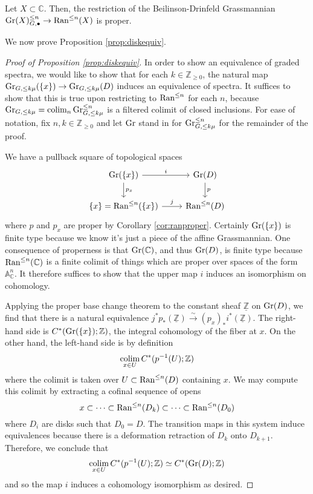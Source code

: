 \begin{cor}\label{cor:ranproper}
Let $X\subset \mathbb{C}$.  Then, the restriction of the Beilinson-Drinfeld Grassmannian $\operatorname{\mathrm{Gr}}(X)_{G,\bullet}^{\leq n} \to \mathrm{Ran}^{\leq n}(X)$ is proper.
\end{cor}

We now prove Proposition \ref{prop:diskequiv}.  

\begin{proof}[Proof of Proposition \ref{prop:diskequiv}]
In order to show an equivalence of graded spectra, we would like to show that for each $k\in \mathbb{Z}_{\geq 0}$, the natural map $\operatorname{\mathrm{Gr}}_{G,\leq k \mu}(\{ x\}) \to \operatorname{\mathrm{Gr}}_{G,\leq k\mu}(D)$ induces an equivalence of spectra.  It suffices to show that this is true upon restricting to $\operatorname{\mathrm{Ran}}^{\leq n}$ for each $n$, because $\operatorname{\mathrm{Gr}}_{G, \leq k \mu} = \operatorname*{\mathrm{colim}}_n \operatorname{\mathrm{Gr}}^{\leq n}_{G,\leq k\mu}$ is a filtered colimit of closed inclusions.  For ease of notation, fix $n,k\in \mathbb{Z}_{\geq 0}$ and let $\operatorname{\mathrm{Gr}}$ stand in for $\operatorname{\mathrm{Gr}}^{\leq n}_{G,\leq k \mu}$ for the remainder of the proof.  

We have a pullback square of topological spaces 
\begin{equation*}
\begin{tikzcd}
\Gra (\{ x\}) \arrow[r,"i"]\arrow[d,"p_x"] & \Gra (D) \arrow[d,"p"]\\
\{x \} = \Ran^{\leq n}(\{ x\} )\arrow[r,"j"] & \Ran^{\leq n}(D)
\end{tikzcd} \end{equation*}
where $p$ and $p_x$ are proper by Corollary \ref{cor:ranproper}.  Certainly $\operatorname{\mathrm{Gr}}(\{ x\})$ is finite type because we know it's just a piece of the affine Grassmannian.  One consequence of properness is that $\operatorname{\mathrm{Gr}}(\mathbb{C})$, and thus $\operatorname{\mathrm{Gr}}(D)$, is finite type because $\operatorname{\mathrm{Ran}}^{\leq n}(\mathbb{C})$ is a finite colimit of things which are proper over spaces of the form $\mathbb{A}^n_{\mathbb{C}}$.  It therefore suffices to show that the upper map $i$ induces an isomorphism on cohomology.  

Applying the proper base change theorem to the constant sheaf $\underline{\mathbb{Z}}$ on $\operatorname{\mathrm{Gr}}(D)$, we find that there is a natural equivalence $j^*p_*(\underline{\mathbb{Z}}) \xrightarrow{\sim} (p_x)_{*}i^*(\underline{\mathbb{Z}}).$  The right-hand side is $C^*(\operatorname{\mathrm{Gr}}(\{x\}) ;\mathbb{Z})$, the integral cohomology of the fiber at $x$.  On the other hand, the left-hand side is by definition $$\operatorname*{\mathrm{colim}}_{x\in U} C^*(p^{-1}(U);\mathbb{Z})$$ where the colimit is taken over $U\subset \operatorname{\mathrm{Ran}}^{\leq n}(D)$ containing $x$.  We may compute this colimit by extracting a cofinal sequence of opens $$x \subset \cdots \subset \operatorname{\mathrm{Ran}}^{\leq n}(D_k) \subset \cdots \subset \operatorname{\mathrm{Ran}}^{\leq n}(D_0)$$ where $D_i$ are disks such that $D_0=D$.  The transition maps in this system induce equivalences because there is a deformation retraction of $D_k$ onto $D_{k+1}$.  Therefore, we conclude that $$\operatorname*{\mathrm{colim}}_{x\in U} C^*(p^{-1}(U);\mathbb{Z}) \simeq C^*(\operatorname{\mathrm{Gr}}(D); \mathbb{Z})$$ and so the map $i$ induces a cohomology isomorphism as desired.  
\end{proof} 


